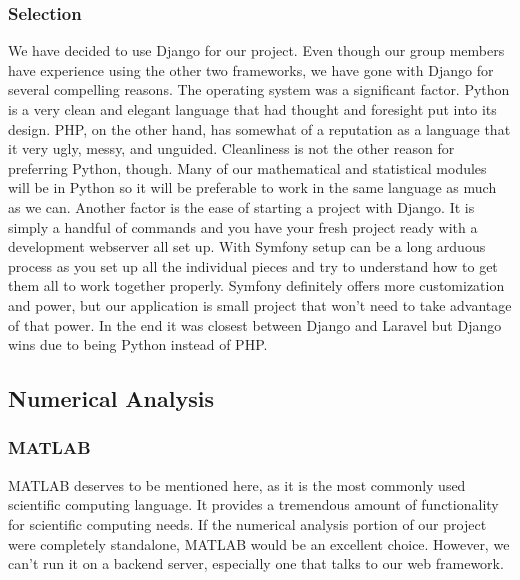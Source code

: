 \subsubsection{Selection}
We have decided to use Django for our project. 
Even though our group members have experience using the other two frameworks, we have gone with Django for several compelling reasons. 
The operating system was a significant factor. 
Python is a very clean and elegant language that had thought and foresight put into its design. 
PHP, on the other hand, has somewhat of a reputation as a language that it very ugly, messy, and unguided. 
 Cleanliness is not the other reason for preferring Python, though. 
 Many of our mathematical and statistical modules will be in Python so it will be preferable to work in the same language as much as we can. 
 Another factor is the ease of starting a project with Django. 
 It is simply a handful of commands and you have your fresh project ready with a development webserver all set up. 
 With Symfony setup can be a long arduous process as you set up all the individual pieces and try to understand how to get them all to work together properly. 
 Symfony definitely offers more customization and power, but our application is small project that won’t need to take advantage of that power. 
 In the end it was closest between Django and Laravel but Django wins due to being Python instead of PHP.


\subsection{Numerical Analysis}

\subsubsection{MATLAB}
MATLAB deserves to be mentioned here, as it is the most commonly used scientific computing language. 
It provides a tremendous amount of functionality for scientific computing needs. 
If the numerical analysis portion of our project were completely standalone, MATLAB would be an excellent choice. 
However, we can’t run it on a backend server, especially one that talks to our web framework.

